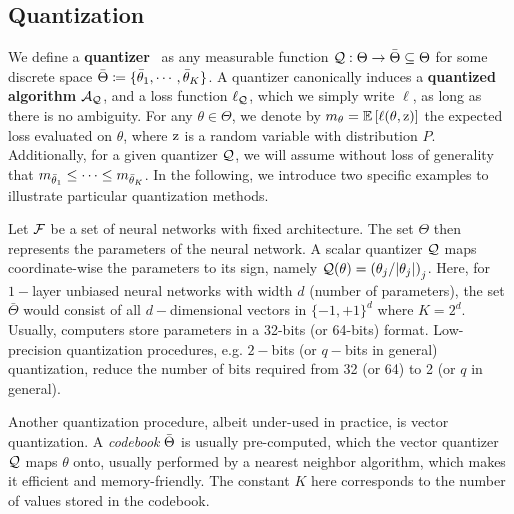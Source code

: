 \subsection{Quantization}
\label{subsec:quantization}
We define a \textbf{quantizer}~\cite{citeulike:12927267} as any measurable function ${\mathcal{Q}}:\Theta\to\Bar{\Theta}\subseteq\Theta$ for some discrete space $\Bar{\Theta}\coloneqq\{{\Bar{\theta}}_1,\cdots,{\Bar{\theta}}_K\}$. 
A quantizer canonically induces a \textbf{quantized algorithm} ${\mathcal{A}}_{\mathcal{Q}}$, and a loss function $\ell_{{\mathcal{Q}}}$, which we simply write $\ell$, as long as there is no ambiguity. For any $\theta\in\Theta$, we denote by $m_\theta=\mathbb{E}\left[\ell(\theta,{\textnormal{z}})\right]$ the expected loss evaluated on $\theta$, where ${\textnormal{z}}$ is a random variable with distribution $P$. Additionally, for a given quantizer ${\mathcal{Q}}$, we will assume without loss of generality that $m_{{\Bar{\theta}}_1}\leq\cdots\leq m_{{\Bar{\theta}}_K}$. 
In the following, we introduce two specific examples to illustrate particular quantization methods.

\begin{example}
\label{ex:BNN}
Let ${\mathcal{F}}$ be a set of neural networks with fixed architecture. The set $\Theta$ then represents the parameters of the neural network. A scalar quantizer ${\mathcal{Q}}$ maps coordinate-wise the parameters to its sign, namely ${\mathcal{Q}}(\theta) = \left(\theta_j/|\theta_j|\right)_j$. Here, for $1-$layer unbiased neural networks with width $d$ (number of parameters), the set $\bar{\Theta}$ would consist of all $d-$dimensional vectors in $\{-1,+1\}^d$ where $K = 2^{d}$. Usually, computers store parameters in a 32-bits (or 64-bits) format. Low-precision quantization procedures, e.g. $2-$bits (or $q-$bits in general) quantization, reduce the number of bits required from 32 (or 64) to 2 (or $q$ in general).
\end{example}

\begin{example}
Another quantization procedure, albeit under-used in practice, is vector quantization. A \textit{codebook} ${\Bar{\Theta}}$ is usually pre-computed, which the vector quantizer ${\mathcal{Q}}$ maps $\theta$ onto, usually performed by a nearest neighbor algorithm, which makes it efficient and memory-friendly. The constant $K$ here corresponds to the number of values stored in the codebook.
    


\end{example}


